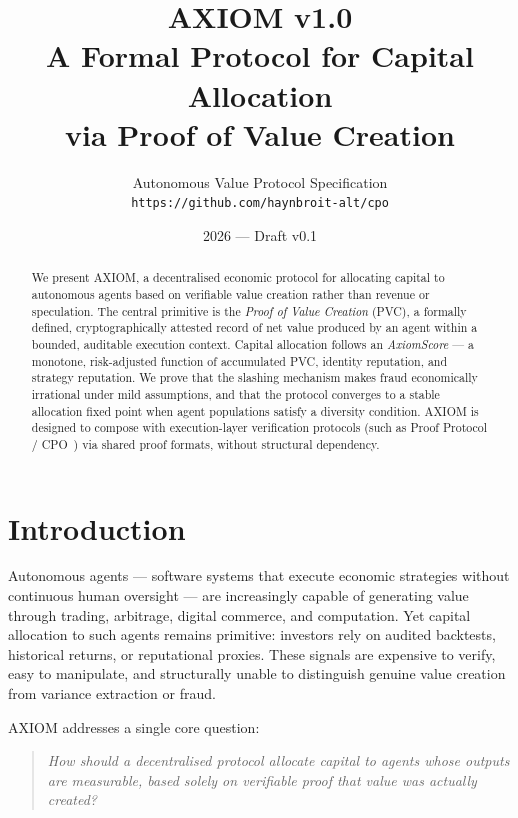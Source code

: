 \documentclass[11pt,a4paper]{article}
\title{%
  \textbf{AXIOM v1.0}\\[0.5em]
  \large A Formal Protocol for Capital Allocation\\
  via Proof of Value Creation
}
\author{%
  Autonomous Value Protocol Specification\\[0.3em]
  \small \texttt{https://github.com/haynbroit-alt/cpo}
}
\date{2026 — Draft v0.1}
\theoremstyle{plain}
\theoremstyle{definition}
\theoremstyle{remark}
\begin{document}
\maketitle

\begin{abstract}
We present AXIOM, a decentralised economic protocol for allocating capital to
autonomous agents based on verifiable value creation rather than revenue or
speculation. The central primitive is the \emph{Proof of Value Creation} (PVC),
a formally defined, cryptographically attested record of net value produced by
an agent within a bounded, auditable execution context. Capital allocation
follows an \emph{AxiomScore} — a monotone, risk-adjusted function of
accumulated PVC, identity reputation, and strategy reputation. We prove that
the slashing mechanism makes fraud economically irrational under mild
assumptions, and that the protocol converges to a stable allocation fixed point
when agent populations satisfy a diversity condition. AXIOM is designed to
compose with execution-layer verification protocols (such as Proof
Protocol / CPO~\cite{cpp2025}) via shared proof formats, without structural
dependency.
\end{abstract}

\tableofcontents
\newpage

\section{Introduction}

Autonomous agents — software systems that execute economic strategies without
continuous human oversight — are increasingly capable of generating value
through trading, arbitrage, digital commerce, and computation. Yet capital
allocation to such agents remains primitive: investors rely on audited backtests,
historical returns, or reputational proxies. These signals are expensive to
verify, easy to manipulate, and structurally unable to distinguish genuine value
creation from variance extraction or fraud.

AXIOM addresses a single core question:

\begin{quote}
\emph{How should a decentralised protocol allocate capital to agents whose
outputs are measurable, based solely on verifiable proof that value was
actually created?}
\end{quote}
\end{document}
